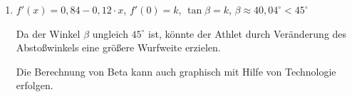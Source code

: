 \begin{langesbeispiel}
{\begin{enumerate}
	$14-3,26=10,74$
	
	Die Wurfweite der Kugel war 10,74\,m.
	
	Die Wurfweite wird bestimmt durch die rechte Nullstelle der Parabel:
	
	$0=\tan\beta\cdot x-\dfrac{g}{2v_0^2\cdot \cos^2\beta}\cdot x^2$
	
	$0=x\cdot\left(\tan\beta-\dfrac{g}{2v_0^2\cdot \cos^2\beta}\cdot x\right)$
	
	$x=\dfrac{\tan\beta\cdot 2v_0^2\cdot\cos^2\beta}{g}$
			
			Bei größerem $g$ wird die Wurfweite kleiner. Es liegt eine indirekte Proportionalität vor.
			
			\item $f'(x)=0,84-0,12\cdot x$, $f'(0)=k$, $\tan\beta=k$, $\beta\approx 40,04^\circ<45^\circ$
			
			Da der Winkel $\beta$ ungleich $45^\circ$ ist, könnte der Athlet durch Veränderung des Abstoßwinkels eine größere Wurfweite erzielen.
			
			Die Berechnung von Beta kann auch graphisch mit Hilfe von Technologie erfolgen.
			\end{enumerate}}
		\end{langesbeispiel}
